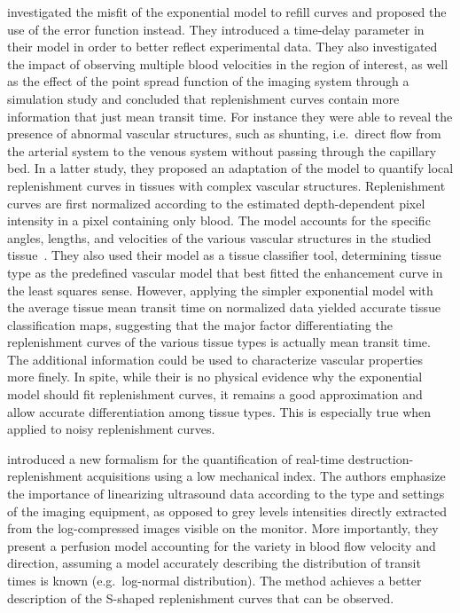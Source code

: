 \citet{Potdevin:2004eq} investigated the misfit of the exponential model to refill curves and proposed the use of the error function instead.
They introduced a time-delay parameter in their model in order to better reflect experimental data. 
They also investigated the impact of observing multiple blood velocities in the region of interest, as well as the effect of the point spread function of the imaging system through a simulation study and concluded that replenishment curves contain more information that just mean transit time. %
For instance they were able to reveal the presence of abnormal vascular structures, such as shunting, i.e.~direct flow from the arterial system to the venous system without passing through the capillary bed.
In a latter study, they proposed an adaptation of the model to quantify local replenishment curves in tissues with complex vascular structures.
Replenishment curves are first normalized according to the estimated depth-dependent pixel intensity in a pixel containing only blood.
The model accounts for the specific angles, lengths, and velocities of the various vascular structures in the studied tissue~\cite{Potdevin:2006fs}. %
They also used their model as a tissue classifier tool, determining tissue type as the predefined vascular model that best fitted the enhancement curve in the least squares sense.
However, applying the simpler exponential model with the average tissue mean transit time on normalized data yielded accurate tissue classification maps, suggesting that the major factor differentiating the replenishment curves of the various tissue types is actually mean transit time.
The additional information could be used to characterize vascular properties more finely.
In spite, while their is no physical evidence why the exponential model should fit replenishment curves, it remains a good approximation and allow accurate differentiation among tissue types.
This is especially true when applied to noisy replenishment curves.

\citet{Arditi:2006ip} introduced a new formalism for the quantification of real-time destruction-replenishment acquisitions using a low mechanical index. %
The authors emphasize the importance of linearizing ultrasound data according to the type and settings of the imaging equipment, as opposed to grey levels intensities directly extracted from the log-compressed images visible on the monitor.
More importantly, they present a perfusion model accounting for the variety in blood flow velocity and direction, assuming a model accurately describing the distribution of transit times is known (e.g.~log-normal distribution).
The method achieves a better description of the S-shaped replenishment curves that can be observed.

